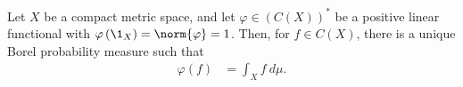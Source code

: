 \begin{theorem}
  Let $X$ be a compact metric space, and let $\varphi\in \left(C\left(X\right)\right)^{\ast}$ be a positive linear functional with $\varphi\left(\1_{X}\right) = \norm{\varphi} = 1$. Then, for $f\in C(X)$, there is a unique Borel probability measure such that
  \begin{align*}
    \varphi\left(f\right) &= \int_{X}^{} f\:d\mu.
  \end{align*}
\end{theorem}
